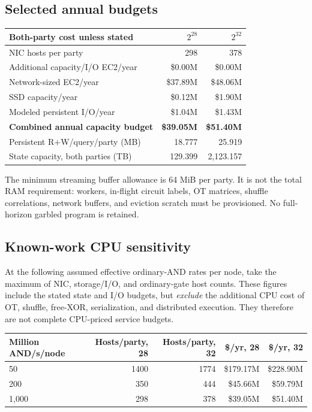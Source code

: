 \documentclass[11pt]{article}
\begin{document}
\subsection{Selected annual budgets}
\begin{center}\small
\begin{tabular}{lrr}\toprule
Both-party cost unless stated & $2^{28}$ & $2^{32}$\\\midrule
NIC hosts per party & 298 & 378\\
Additional capacity/I/O EC2/year & \$0.00M & \$0.00M\\
Network-sized EC2/year & \$37.89M & \$48.06M\\
SSD capacity/year & \$0.12M & \$1.90M\\
Modeled persistent I/O/year & \$1.04M & \$1.43M\\
\textbf{Combined annual capacity budget} & \textbf{\$39.05M} & \textbf{\$51.40M}\\
Persistent R+W/query/party (MB) & 18.777 & 25.919\\
State capacity, both parties (TB) & 129.399 & 2,123.157\\
\bottomrule\end{tabular}
\end{center}

The minimum streaming buffer allowance is 64 MiB per
party. It is not the total RAM requirement: workers, in-flight circuit labels,
OT matrices, shuffle correlations, network buffers, and eviction scratch must
be provisioned. No full-horizon garbled program is retained.

\subsection{Known-work CPU sensitivity}
At the following assumed effective ordinary-AND rates per node, take the
maximum of NIC, storage/I/O, and ordinary-gate host counts. These figures
include the stated state and I/O budgets, but \emph{exclude} the additional
CPU cost of OT, shuffle, free-XOR, serialization, and distributed execution.
They therefore are not complete CPU-priced service budgets.

\begin{center}\small
\begin{tabular}{lrrrr}\toprule
Million AND/s/node & Hosts/party, 28 & Hosts/party, 32 & \$/yr, 28 & \$/yr, 32\\\midrule
50 & 1400 & 1774 & \$179.17M & \$228.90M\\
200 & 350 & 444 & \$45.66M & \$59.79M\\
1,000 & 298 & 378 & \$39.05M & \$51.40M\\
\bottomrule\end{tabular}
\end{center}
\end{document}
